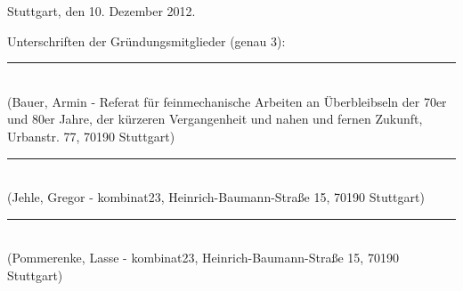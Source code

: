 \documentclass[a4paper]{article}
\begin{document}
\bigskip 

Stuttgart, den 10. Dezember 2012.

\medskip 

Unterschriften der Gründungsmitglieder (genau 3):


\newcommand{\signature}[1]{
\rule[-1.5cm]{11.5cm}{1pt}\\
\hspace*{13pt}({#1})
}


\signature{Bauer, Armin - Referat für feinmechanische Arbeiten an Überbleibseln der 70er und 80er Jahre, der kürzeren Vergangenheit und nahen und fernen Zukunft, Urbanstr. 77, 70190 Stuttgart}

\signature{Jehle, Gregor - kombinat23, Heinrich-Baumann-Straße 15, 70190 Stuttgart}

\signature{Pommerenke, Lasse - kombinat23, Heinrich-Baumann-Straße 15, 70190 Stuttgart}
\end{document}
